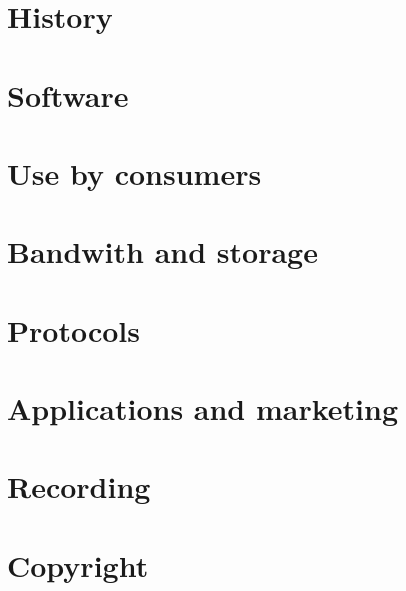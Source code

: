 
\section{History}

\section{Software}

\section{Use by consumers}

\section{Bandwith and storage}

\section{Protocols}

\section{Applications and marketing}

\section{Recording}

\section{Copyright}